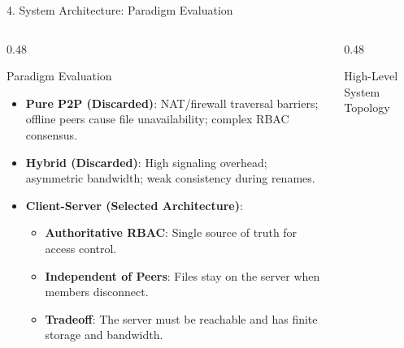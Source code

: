 \documentclass[t, aspectratio=169]{beamer}
\begin{document}
\begin{frame}{4. System Architecture: Paradigm Evaluation}
\small
\begin{columns}[T]
\begin{column}{0.48\textwidth}
\begin{block}{Paradigm Evaluation}
\scriptsize
\begin{itemize}
    \setlength{\itemsep}{1.5pt}
    \item \textbf{Pure P2P (Discarded)}: NAT/firewall traversal barriers; offline peers cause file unavailability; complex RBAC consensus.
    \item \textbf{Hybrid (Discarded)}: High signaling overhead; asymmetric bandwidth; weak consistency during renames.
    \item \textbf{Client-Server (Selected Architecture)}:
    \begin{itemize}
        \setlength{\itemsep}{1pt}
        \item \textbf{Authoritative RBAC}: Single source of truth for access control.
        \item \textbf{Independent of Peers}: Files stay on the server when members disconnect.
        \item \textbf{Tradeoff}: The server must be reachable and has finite storage and bandwidth.
    \end{itemize}
\end{itemize}
\end{block}
\end{column}

\begin{column}{0.48\textwidth}
\begin{block}{High-Level System Topology}
\centering
\vspace{1pt}
\end{block}
\end{column}
\end{columns}
\end{frame}
\end{document}
